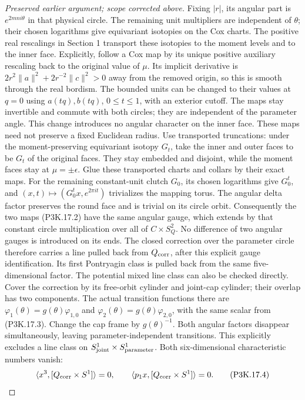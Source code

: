 \begin{proof}[Preserved earlier argument; scope corrected above]
Fixing \(|r|\), its angular part is
\(e^{2mn i\theta}\) in that physical circle.  The remaining
unit multipliers are independent of \(\theta\); their
chosen logarithms give equivariant isotopies on the Cox
charts.  The positive real rescalings in Section 1 transport
these isotopies to the moment levels and to the inner face.
Explicitly, follow a Cox map by its unique positive auxiliary
rescaling back to the original value of \(\mu\).  Its
implicit derivative is
\(2r^2\|a\|^2+2r^{-2}\|c\|^2>0\) away from the
removed origin, so this is smooth through the real bordism.
The bounded units can be changed to their values at \(q=0\)
using \(a(tq),b(tq)\), \(0\le t\le1\), with an
exterior cutoff.  The maps stay invertible and commute with
both circles; they are independent of the parameter angle.
This change introduces no angular character on the inner face.
These maps need not preserve a fixed Euclidean radius.
Use transported truncations: under the moment-preserving
equivariant isotopy \(G_t\), take the inner and outer
faces to be \(G_t\) of the original faces.  They stay
embedded and disjoint, while the moment faces stay at
\(\mu=\pm\epsilon\).  Glue these transported charts
and collars by their exact maps.  For the remaining
constant-unit clutch \(G_0\), its chosen logarithms give
\(G_0^t\), and
\((x,t)\mapsto(G_0^t x,e^{2\pi it})\) trivializes
the mapping torus.  The angular delta factor preserves
the round face and is trivial on its circle orbit.
Consequently the two maps (P3K.17.2) have the same angular
gauge, which extends by that constant circle multiplication
over all of \(C\times S^2_Q\).  No difference of two
angular gauges is introduced on its ends.  The closed
correction over the parameter circle therefore carries
a line pulled back from \(Q_{\rm corr}\), after this
explicit gauge identification.  Its first Pontryagin class
is pulled back from the same five-dimensional factor.
The potential mixed line class can also be checked directly.
Cover the correction by its free-orbit cylinder and joint-cap
cylinder; their overlap has two components.  The actual
transition functions there are
\(\varphi_1(\theta)=g(\theta)\varphi_{1,0}\) and
\(\varphi_2(\theta)=g(\theta)\varphi_{2,0}\), with
the same scalar from (P3K.17.3).  Change the cap frame by
\(g(\theta)^{-1}\).  Both angular factors disappear
simultaneously, leaving parameter-independent transitions.
This explicitly excludes a line class on
\(S^1_{\rm joint}\times S^1_{\rm parameter}\).
Both six-dimensional characteristic numbers vanish:
\[
  \langle x^3,[Q_{\rm corr}\times S^1]\rangle=0,
  \qquad
  \langle p_1x,[Q_{\rm corr}\times S^1]\rangle=0.       \tag{P3K.17.4}
\]


\end{proof}
